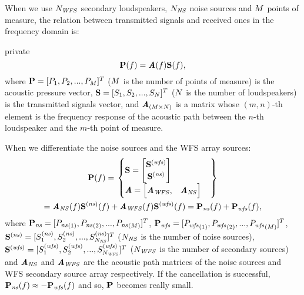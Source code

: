 When we use $N_\mathit{WFS}$ secondary loudspeakers, $N_\mathit{NS}$ noise sources and $M$ points of measure, the relation between transmitted signals and received ones in the frequency domain is:
\begin{shownto}{private}
\begin{equation}
\Field[noValue][frequency][vector](f) = \AcPath[mat](f) \vec{\signal[nothing][frequency]}(f) ,
\end{equation}
where $\Field[noValue][frequency][vector] = [\Field[noValue][frequency][scalar]_1, \Field[noValue][frequency][scalar]_2, ..., \Field[noValue][frequency][scalar]_\numMeasPoints]^T$ ($M$ is the number of points of measure) is the acoustic pressure vector, $\vec{\signal[nothing][frequency]} = [\signal[nothing][frequency]_1, \signal[nothing][frequency]_2, ..., \signal[nothing][frequency]_\numSources]^T$ ($N$ is the number of loudspeakers) is the transmitted signals vector, and $\AcPath[mat]_{(\numMeasPoints \times \numSources)}$ is a matrix whose $(m,n)$-th element is the frequency response of the acoustic path between the $n$-th loudspeaker and the $m$-th point of measure.

When we differentiate the noise sources and the WFS array sources:
\begin{multline}
\Field[noValue][frequency][vector](f)
= \left. \begin{cases}
\vec{\signal[nothing][frequency]} = 
\begin{bmatrix}
\vec{\signal[wfs][frequency]} \\
\vec{\signal[ns][frequency]}
\end{bmatrix} \\
\AcPath[mat] =
\begin{bmatrix}
\AcPath[mat][WFS], & \AcPath[mat][NS]
\end{bmatrix}
\end{cases} \right\} \\
 = \AcPath[mat][NS](f) \vec{\signal[ns][frequency]}(f) + \AcPath[mat][WFS](f) \vec{\signal[wfs][frequency]}(f)
 = \Field[ns][frequency][vector](f) + \Field[wfs][frequency][vector](f),
\end{multline}
where $\Field[ns][frequency][vector] = [\Field[ns][frequency][scalar][1], \Field[ns][frequency][scalar][2], ..., \Field[ns][frequency][scalar][\numMeasPoints]]^T$, $\Field[wfs][frequency][vector] = [\Field[wfs][frequency][scalar][1], \Field[wfs][frequency][scalar][2], ..., \Field[wfs][frequency][scalar][\numMeasPoints]]^T$, $\vec{\signal[ns][frequency]} = [\signal[ns][frequency]_1, \signal[ns][frequency]_2, ..., \signal[ns][frequency]_{\numNS}]^T$ ($N_\mathit{NS}$ is the number of noise sources), $\vec{\signal[wfs][frequency]} = [\signal[wfs][frequency]_1, \signal[wfs][frequency]_2, ..., \signal[wfs][frequency]_{\numWFS}]^T$ ($N_\mathit{WFS}$ is the number of secondary sources) and $\AcPath[mat][NS]$ and $\AcPath[mat][WFS]$ are the acoustic path matrices of the noise sources and WFS secondary source array respectively. If the cancellation is successful, $\Field[ns][frequency][vector](f) \approx -\Field[wfs][frequency][vector](f)$ and so, $\Field[noValue][frequency][vector]$ becomes really small.
\end{shownto}

